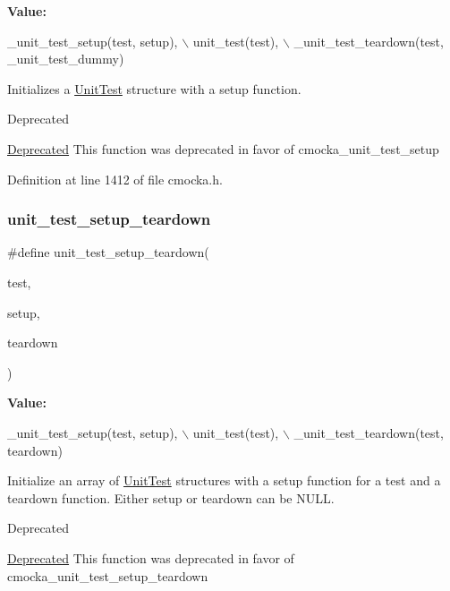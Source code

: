 {\bfseries Value\+:}
\begin{DoxyCode}
\_unit\_test\_setup(test, setup), \(\backslash\)
    unit\_test(test), \(\backslash\)
    \_unit\_test\_teardown(test, \_unit\_test\_dummy)
\end{DoxyCode}
Initializes a \hyperlink{structUnitTest}{Unit\+Test} structure with a setup function.

\begin{DoxyRefDesc}{Deprecated}
\item[\hyperlink{deprecated__deprecated000002}{Deprecated}]This function was deprecated in favor of cmocka\+\_\+unit\+\_\+test\+\_\+setup \end{DoxyRefDesc}


Definition at line 1412 of file cmocka.\+h.

\mbox{\label{group__cmocka__exec_gaee80106db018434c00df4ba235415b26}} 
\subsubsection{\texorpdfstring{unit\+\_\+test\+\_\+setup\+\_\+teardown}{unit\_test\_setup\_teardown}}
{\footnotesize\ttfamily \#define unit\+\_\+test\+\_\+setup\+\_\+teardown(\begin{DoxyParamCaption}\item[{}]{test,  }\item[{}]{setup,  }\item[{}]{teardown }\end{DoxyParamCaption})}

{\bfseries Value\+:}
\begin{DoxyCode}
\_unit\_test\_setup(test, setup), \(\backslash\)
    unit\_test(test), \(\backslash\)
    \_unit\_test\_teardown(test, teardown)
\end{DoxyCode}
Initialize an array of \hyperlink{structUnitTest}{Unit\+Test} structures with a setup function for a test and a teardown function. Either setup or teardown can be N\+U\+LL.

\begin{DoxyRefDesc}{Deprecated}
\item[\hyperlink{deprecated__deprecated000006}{Deprecated}]This function was deprecated in favor of cmocka\+\_\+unit\+\_\+test\+\_\+setup\+\_\+teardown \end{DoxyRefDesc}


